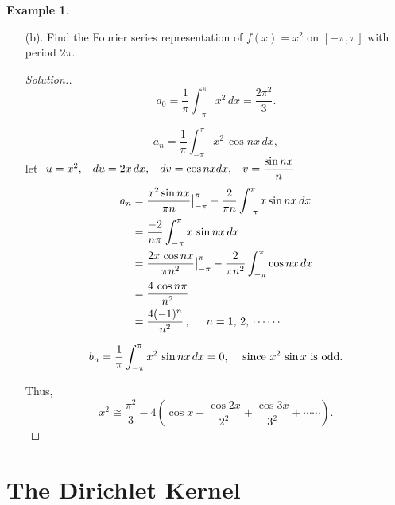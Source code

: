 \documentclass[12pt,a4paper]{report}
\theoremstyle{definition}
\newtheorem{exa}[thm]{Example}
\theoremstyle{plain}
\begin{document}
\begin{exa}
\begin{enumerate}
\begin{proof}[Solution.]
For $n = 0$, 
$$a_0 = \frac{1}{\pi}\int_0^{\pi}f(x)\, dx = \frac{1}{\pi^2}\int_0^{\pi}x\, dx = \frac{1}{2}.$$
Thus
$$f(x) \cong \frac{1}{4} - \frac{2}{\pi^2}\sum_{n=1}^{\infty}\frac{1}{(2n - 1)^2}\, \cos [(2n-1)x] - \frac{1}{\pi}\sum^{\infty}_{n=1}\frac{(-1)^n}{n}\,\sin nx.$$
Since $a_n$ is defined on odd hence we make $n^2$ odd as $(2n-1)$.
\end{proof}







\item[(b).] Find the Fourier series representation of $f(x) = x^2$ on $[-\pi,\pi]$ with period $2\pi$.


\begin{proof}[Solution.]

$$a_0 = \frac{1}{\pi}\int_{-\pi}^{\pi} x^2 \, dx = \frac{2\pi^2}{3}.$$

$$a_n = \frac{1}{\pi}\int_{-\pi}^{\pi} x^2\, \cos nx\, dx,$$
let $\, \, u= x^2, \hspace{0.3cm} du = 2x\, dx, \hspace{0.3cm} dv = \cos nx dx, \hspace{0.3cm} v = \dfrac{\sin nx}{n}$
\begin{align*}
a_n & = \frac{x^2\sin nx}{\pi n}\big|^{\pi}_{-\pi} - \frac{2}{\pi n}\int_{-\pi}^{\pi} x\sin nx\, dx\\
    & = \frac{-2}{n\pi}\int_{-\pi}^{\pi}x\, \sin nx\, dx\\
    & = \frac{2x\, \cos nx}{\pi n^2}\big|_{-\pi}^{\pi} - \frac{2}{\pi n^2}\int_{-\pi}^{\pi}\cos nx\, dx\\
    & = \frac{4\, \cos n\pi}{n^2}\\
    & = \frac{4(-1)^n}{n^2}\, , \hspace{0.5cm} n = 1, \, 2, \, \cdots\cdots
\end{align*}

$$b_n = \frac{1}{\pi}\int_{-\pi}^{\pi}x^2\, \sin nx\,dx = 0, \, \,\hspace{0.3cm} \text{since}\, \, x^2\, \sin x\,\, \text{is odd}.$$

Thus, $$x^2 \cong \frac{\pi^2}{3} - 4\left(\cos x - \frac{\cos 2x}{2^2} + \frac{\cos 3x}{3^2} + \cdots\cdots\right).$$
\end{proof}
\end{enumerate}
\end{exa}


\section{The Dirichlet Kernel}
\end{document}

